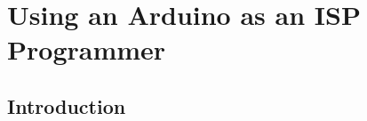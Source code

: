 \chapter{Using an Arduino as an ISP Programmer}
\label{using-an-arduino-as-an-isp-programmer}

\section{Introduction}\label{arduino-isp-introduction}
